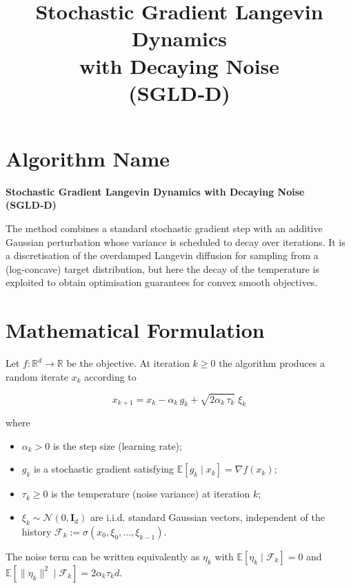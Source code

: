 \documentclass{article}
\title{Stochastic Gradient Langevin Dynamics \\ with Decaying Noise \\ (SGLD‑D)}
\author{}
\date{}
\newcommand{\E}{\mathbb{E}}
\newcommand{\R}{\mathbb{R}}
\begin{document}
\maketitle

\section*{Algorithm Name}
\textbf{Stochastic Gradient Langevin Dynamics with Decaying Noise (SGLD‑D)}  

The method combines a standard stochastic gradient step with an additive Gaussian perturbation whose variance is scheduled to decay over iterations. It is a discretisation of the overdamped Langevin diffusion for sampling from a (log‑concave) target distribution, but here the decay of the temperature is exploited to obtain optimisation guarantees for convex smooth objectives.

\section*{Mathematical Formulation}
Let $f:\R^{d}\to\R$ be the objective.  At iteration $k\ge 0$ the algorithm produces a random iterate $x_{k}$ according to  

\[
\boxed{
x_{k+1}=x_{k}-\alpha_{k}\,g_{k}+\sqrt{2\alpha_{k}\,\tau_{k}}\;\xi_{k}}
\tag{1}
\]

where  

\begin{itemize}[nosep]
\item $\alpha_{k}>0$ is the step size (learning rate);
\item $g_{k}$ is a stochastic gradient satisfying $\E[g_{k}\mid x_{k}]=\nabla f(x_{k})$;
\item $\tau_{k}\ge0$ is the temperature (noise variance) at iteration $k$;
\item $\xi_{k}\sim\mathcal N(0,\mathbf I_{d})$ are i.i.d. standard Gaussian vectors, independent of the history $\mathcal F_{k}:=\sigma(x_{0},\xi_{0},\dots,\xi_{k-1})$.
\end{itemize}

The noise term can be written equivalently as $\eta_{k}$ with $\E[\eta_{k}\mid\mathcal F_{k}]=0$ and $\E[\|\eta_{k}\|^{2}\mid\mathcal F_{k}]=2\alpha_{k}\tau_{k}d$.
\end{document}
